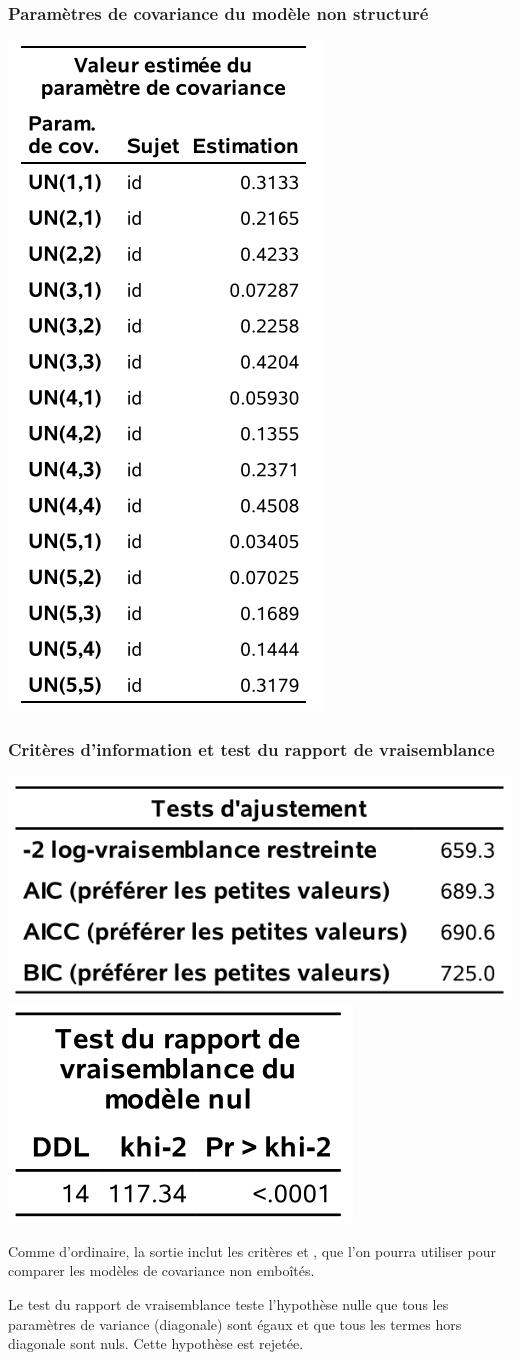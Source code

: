 \documentclass{beamer}
\begin{document}
\begin{frame}
\frametitle{Paramètres de covariance du modèle non structuré}
\begin{center}
\includegraphics[width = 0.30\linewidth]{img/c5/diapos6-e22}
\end{center}

\end{frame}

\begin{frame}
\frametitle{Critères d'information et test du rapport de vraisemblance}

\begin{center}
\includegraphics[width = 0.5\linewidth]{img/c5/diapos6-e23}
\includegraphics[width = 0.3\linewidth]{img/c5/diapos6-e24}

\end{center}
\bi
\item Comme d'ordinaire, la sortie inclut les critères \AIC{} et \BIC{}, que l'on pourra utiliser pour comparer les modèles de covariance non emboîtés.
\item Le test du rapport de vraisemblance teste l'hypothèse nulle que tous les paramètres de variance (diagonale) sont égaux et que tous les termes hors diagonale sont nuls. Cette hypothèse est rejetée.
\ei
\end{frame}
\end{document}
